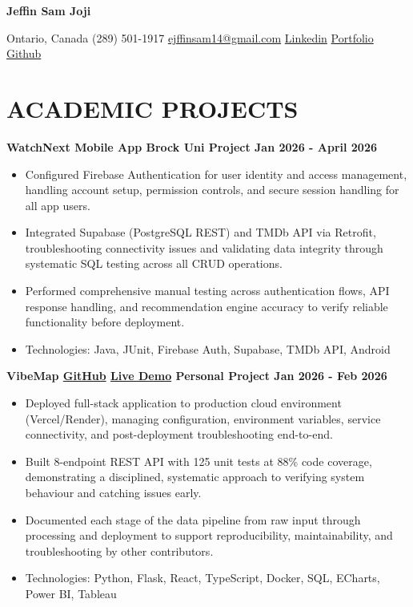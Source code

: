 \documentclass[11pt]{article}
\begin{document}
\newpage
\begin{center}
    {\Huge \textbf{Jeffin Sam Joji}}

 Ontario, Canada \textbar{} (289) 501-1917 \textbar{} \href{mailto:ejffinsam14@gmail.com}{ejffinsam14@gmail.com} \textbar{} \href{https://linkedin.com/in/jeffin-sam-joji}{Linkedin} \textbar{} \href{https://jeff13in.github.io/Portfolio/}{Portfolio} \textbar{} \href{https://github.com/jeff13in}{Github}
\end{center}

\section*{ACADEMIC PROJECTS}
\textbf{WatchNext Mobile App \textbar{} Brock Uni Project \textbar{} Jan 2026 - April 2026}
\begin{itemize}[leftmargin=1.5em, topsep=0pt, itemsep=0pt, parsep=0pt]
\item    Configured Firebase Authentication for user identity and access management, handling account setup, permission controls, and secure session handling for all app users.
\item    Integrated Supabase (PostgreSQL REST) and TMDb API via Retrofit, troubleshooting connectivity issues and validating data integrity through systematic SQL testing across all CRUD operations.
\item    Performed comprehensive manual testing across authentication flows, API response handling, and recommendation engine accuracy to verify reliable functionality before deployment.
\item    Technologies: Java, JUnit, Firebase Auth, Supabase, TMDb API, Android
\end{itemize}
\textbf{VibeMap \href{https://github.com/jeff13in/VibeMap}{GitHub} \textbar{} \href{https://vibe-map-azure.vercel.app/}{Live Demo} \textbar{} Personal Project \textbar{} Jan 2026 - Feb 2026}
\begin{itemize}[leftmargin=1.5em, topsep=0pt, itemsep=0pt, parsep=0pt]
\item    Deployed full-stack application to production cloud environment (Vercel/Render), managing configuration, environment variables, service connectivity, and post-deployment troubleshooting end-to-end.
\item    Built 8-endpoint REST API with 125 unit tests at 88\% code coverage, demonstrating a disciplined, systematic approach to verifying system behaviour and catching issues early.
\item    Documented each stage of the data pipeline from raw input through processing and deployment to support reproducibility, maintainability, and troubleshooting by other contributors.
\item    Technologies: Python, Flask, React, TypeScript, Docker, SQL, ECharts, Power BI, Tableau
\end{itemize}
\end{document}
